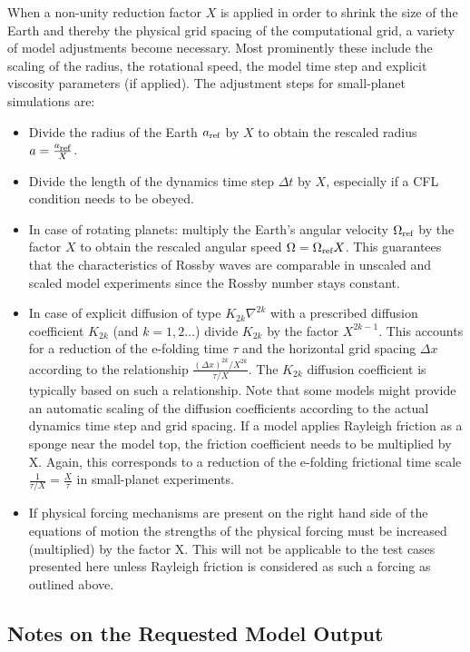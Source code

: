 \documentclass[times,doublespace]{fldauth}
\begin{document}
When a non-unity reduction factor $X$ is applied in order to shrink the size of the Earth and thereby the physical grid spacing of the computational grid, a variety of model adjustments become necessary.
Most prominently these include the scaling of the radius, the rotational speed, the model time step and explicit viscosity parameters (if applied). The adjustment steps for small-planet simulations are:
\begin{itemize}
\item Divide the radius of the Earth $a_{\tiny \mbox{ref}}$ by $X$ to obtain the rescaled radius $a  = \frac{a_{\tiny \mbox{ref}}}{X}$.
\item Divide the length of the dynamics time step $\Delta t$ by $X$, especially if a CFL condition needs to be obeyed.
\item In case of rotating planets: multiply the Earth's angular velocity $\Omega_{\tiny \mbox{ref}}$ by the factor $X$ to obtain the rescaled angular speed $\Omega = \Omega_{\tiny \mbox{ref}}X$. This guarantees that the characteristics of Rossby waves are comparable in unscaled and scaled model experiments since the Rossby number stays constant.
\item In case of explicit diffusion of type $K_{2k}\nabla^{2k}$ with a prescribed diffusion coefficient $K_{2k}$ (and $k=1,2\ldots$) divide $K_{2k}$ by the factor $X^{2k-1}$. This accounts for a reduction of the e-folding time $\tau$  and the horizontal grid spacing $\Delta x$ according to the relationship $\frac{(\Delta x)^{2k}/X^{2k}}{\tau/X}$. The $K_{2k}$ diffusion coefficient is typically based on such a relationship. Note that some models might provide an automatic scaling of the diffusion coefficients according to the actual dynamics time step and grid spacing. If a model applies Rayleigh friction as a sponge near the model top, the friction coefficient needs to be multiplied by X. Again, this corresponds to a reduction of the e-folding frictional time scale $\frac{1}{\tau/X} = \frac{X}{\tau}$ in small-planet experiments.
\item If physical forcing mechanisms are present on the right hand side of the equations of motion the strengths of the physical forcing must be increased (multiplied) by the factor X. This will not be applicable to the test cases presented here unless Rayleigh friction is considered as such a forcing as outlined above.
\end{itemize}

\subsection{Notes on the Requested Model Output}
\label{sec:notes_output}
\end{document}

